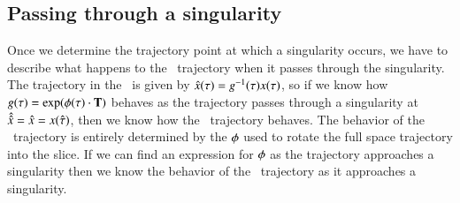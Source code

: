 \subsection{Passing through a singularity}
\label{sect:passingSing}

Once we determine the trajectory point at which a singularity occurs,
we have to describe what happens to the \reducedsp\ trajectory
when it passes through the singularity.
The trajectory in the \reducedsp\ is given by
$\hat{x}(\tau)=g^{-1}(\tau) x(\tau)$,
so if we know how $g(\tau)=\exp({{\bf \phi}(\tau) \cdot \mathbf{T}})$
behaves as the trajectory passes through a singularity at
$\hat{\hat{x}} =  \hat{x} = x(\hat{\tau})$,
then we know how the \reducedsp\ trajectory behaves.
The behavior of the \reducedsp\ trajectory is entirely
determined by the ${\bf \phi}$ used to rotate the full space trajectory
into the slice. If we can find an expression for ${\bf \phi}$ as the trajectory approaches a singularity then we know the behavior of the \reducedsp\ trajectory as it approaches a singularity.

